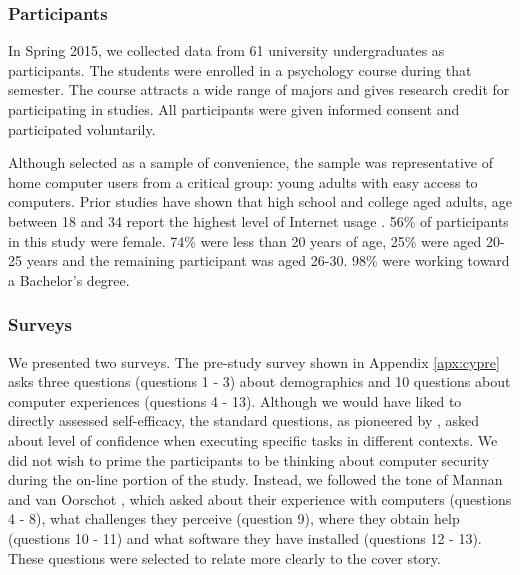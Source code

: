 \subsubsection*{Participants}
In Spring 2015, we collected data from 61 university undergraduates as participants. The students were enrolled in a psychology course during that semester. The course attracts a wide range of majors and gives research credit for participating in studies. All participants were given informed consent and participated voluntarily.

Although selected as a sample of convenience, the sample was representative of home computer users from a critical group: young adults with easy access to computers. Prior studies have shown that high school and college aged adults, age between 18 and 34 report the highest level of Internet usage \cite{census2012}. 56\% of participants in this study were female. 74\% were less than 20 years of age, 25\% were aged 20-25 years and the remaining participant was aged 26-30. 98\% were working toward a Bachelor's degree.

\subsubsection*{Surveys}
We presented two surveys. The pre-study survey shown in Appendix \ref{apx:cypre} asks three questions (questions 1 - 3) about demographics and 10 questions about computer experiences (questions 4 - 13). Although we would have liked to directly assessed self-efficacy, the standard questions, as pioneered by \cite{ng2007, claar2010}, asked about level of confidence when executing specific tasks in different contexts. We did not wish to prime the participants to be thinking about computer security during the on-line portion of the study. Instead, we followed the tone of Mannan and van Oorschot \citeyear{mannan2008}, which asked about their experience with computers (questions 4 - 8), what challenges they perceive (question 9), where they obtain help (questions 10 - 11) and what software they have installed (questions 12 - 13). These questions were selected to relate more clearly to the cover story.

